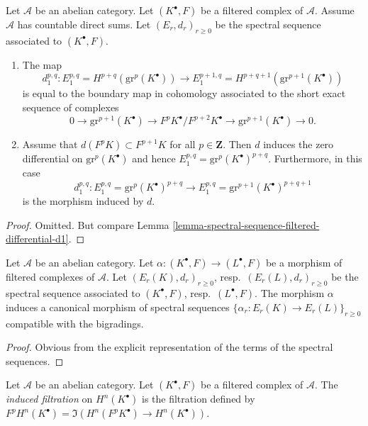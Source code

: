 \begin{lemma}
\label{lemma-spectral-sequence-filtered-complex-d1}
Let $\mathcal{A}$ be an abelian category.
Let $(K^\bullet, F)$ be a filtered complex of $\mathcal{A}$.
Assume $\mathcal{A}$ has countable direct sums.
Let $(E_r, d_r)_{r \geq 0}$ be the spectral sequence
associated to $(K^\bullet, F)$.
\begin{enumerate}
\item The map
$$
d_1^{p, q} :
E_1^{p, q} = H^{p + q}(\text{gr}^p(K^\bullet))
\longrightarrow
E_1^{p + 1, q} = H^{p + q + 1}(\text{gr}^{p + 1}(K^\bullet))
$$
is equal to the boundary map in cohomology associated to the short
exact sequence of complexes
$$
0 \to \text{gr}^{p + 1}(K^\bullet) \to
F^pK^\bullet/F^{p + 2}K^\bullet \to \text{gr}^{p + 1}(K^\bullet) \to 0.
$$
\item Assume that $d(F^pK) \subset F^{p + 1}K$ for all $p \in \mathbf{Z}$.
Then $d$ induces the zero differential on $\text{gr}^p(K^\bullet)$
and hence
$E_1^{p, q} = \text{gr}^p(K^\bullet)^{p + q}$.
Furthermore, in this case
$$
d_1^{p, q} :
E_1^{p, q} = \text{gr}^p(K^\bullet)^{p + q}
\longrightarrow
E_1^{p, q} = \text{gr}^{p + 1}(K^\bullet)^{p + q + 1}
$$
is the morphism induced by $d$.
\end{enumerate}
\end{lemma}

\begin{proof}
Omitted. But compare
Lemma \ref{lemma-spectral-sequence-filtered-differential-d1}.
\end{proof}

\begin{lemma}
\label{lemma-spectral-sequence-filtered-complex-functorial}
Let $\mathcal{A}$ be an abelian category.
Let $\alpha : (K^\bullet, F) \to (L^\bullet, F)$ be a morphism of
filtered complexes of $\mathcal{A}$. Let $(E_r(K), d_r)_{r \geq 0}$,
resp.\ $(E_r(L), d_r)_{r \geq 0}$ be the spectral sequence associated
to $(K^\bullet, F)$, resp.\ $(L^\bullet, F)$.
The morphism $\alpha$ induces a canonical morphism of spectral
sequences $\{\alpha_r : E_r(K) \to E_r(L)\}_{r \geq 0}$ compatible
with the bigradings.
\end{lemma}

\begin{proof}
Obvious from the explicit representation of the terms of the
spectral sequences.
\end{proof}

\begin{definition}
\label{definition-filtration-cohomology-filtered-complex}
Let $\mathcal{A}$ be an abelian category.
Let $(K^\bullet, F)$ be a filtered complex of $\mathcal{A}$.
The {\it induced filtration} on $H^n(K^\bullet)$ is the filtration defined
by $F^pH^n(K^\bullet) = \Im(H^n(F^pK^\bullet) \to H^n(K^\bullet))$.
\end{definition}

